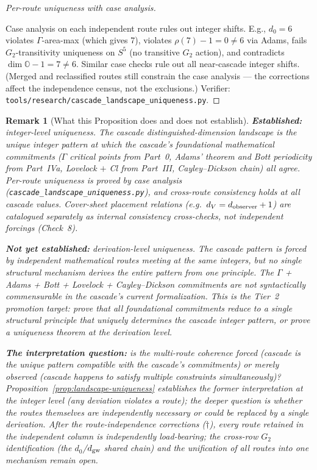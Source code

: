 \documentclass[12pt,a4paper]{article}
\newtheorem*{remark}{Remark}
\begin{document}
\begin{proof}[Per-route uniqueness with case analysis]
\begin{enumerate}[nosep]
\end{enumerate}
Case analysis on each independent route rules out integer shifts. E.g., $d_0 = 6$ violates $\Gamma$-area-max (which gives 7), violates $\rho(7)-1 = 0 \neq 6$ via Adams, fails $G_2$-transitivity uniqueness on $S^5$ (no transitive $G_2$ action), and contradicts $\dim\mathbb{O}-1 = 7 \neq 6$. Similar case checks rule out all near-cascade integer shifts. (Merged and reclassified routes still constrain the case analysis --- the corrections affect the independence census, not the exclusions.) Verifier: \texttt{tools/research/cascade\_landscape\_uniqueness.py}.
\end{proof}

\begin{remark}[What this Proposition does and does not establish]\label{rem:landscape-uniqueness-status}
\textbf{Established:} integer-level uniqueness. The cascade distinguished-dimension landscape is the unique integer pattern at which the cascade's foundational mathematical commitments ($\Gamma$ critical points from Part~0, Adams' theorem and Bott periodicity from Part~IVa, Lovelock $+$ Cl from Part~III, Cayley--Dickson chain) all agree. Per-route uniqueness is proved by case analysis (\texttt{cascade\_landscape\_uniqueness.py}), and cross-route consistency holds at all cascade values. Cover-sheet placement relations (e.g.\ $d_V = d_{\rm observer}+1$) are catalogued separately as internal consistency cross-checks, not independent forcings (Check~8).

\textbf{Not yet established:} derivation-level uniqueness. The cascade pattern is forced by independent mathematical routes \emph{meeting at the same integers}, but no single structural mechanism derives the entire pattern from one principle. The $\Gamma$ + Adams + Bott + Lovelock + Cayley--Dickson commitments are not syntactically commensurable in the cascade's current formalization. This is the Tier~2 promotion target: prove that all foundational commitments reduce to a single structural principle that uniquely determines the cascade integer pattern, or prove a uniqueness theorem at the derivation level.

\textbf{The interpretation question:} is the multi-route coherence \emph{forced} (cascade is the unique pattern compatible with the cascade's commitments) or merely \emph{observed} (cascade happens to satisfy multiple constraints simultaneously)? Proposition~\ref{prop:landscape-uniqueness} establishes the former interpretation at the integer level (any deviation violates a route); the deeper question is whether the routes themselves are independently necessary or could be replaced by a single derivation. After the route-independence corrections ($\dagger$), every route retained in the independent column is independently load-bearing; the cross-row $G_2$ identification (the $d_0$/$d_{\rm gw}$ shared chain) and the unification of all routes into one mechanism remain open.
\end{remark}
\end{document}
